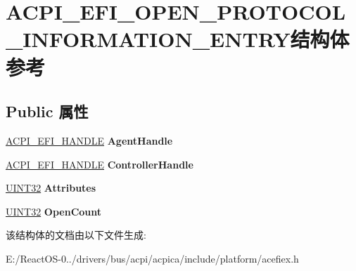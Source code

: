 \hypertarget{struct_a_c_p_i___e_f_i___o_p_e_n___p_r_o_t_o_c_o_l___i_n_f_o_r_m_a_t_i_o_n___e_n_t_r_y}{}\section{A\+C\+P\+I\+\_\+\+E\+F\+I\+\_\+\+O\+P\+E\+N\+\_\+\+P\+R\+O\+T\+O\+C\+O\+L\+\_\+\+I\+N\+F\+O\+R\+M\+A\+T\+I\+O\+N\+\_\+\+E\+N\+T\+R\+Y结构体 参考}
\label{struct_a_c_p_i___e_f_i___o_p_e_n___p_r_o_t_o_c_o_l___i_n_f_o_r_m_a_t_i_o_n___e_n_t_r_y}
\subsection*{Public 属性}
\begin{DoxyCompactItemize}
\item 
\mbox{\label{struct_a_c_p_i___e_f_i___o_p_e_n___p_r_o_t_o_c_o_l___i_n_f_o_r_m_a_t_i_o_n___e_n_t_r_y_af3951330ce0d17396d86d6ebb34a5c09}} 
\hyperlink{interfacevoid}{A\+C\+P\+I\+\_\+\+E\+F\+I\+\_\+\+H\+A\+N\+D\+LE} {\bfseries Agent\+Handle}
\item 
\mbox{\label{struct_a_c_p_i___e_f_i___o_p_e_n___p_r_o_t_o_c_o_l___i_n_f_o_r_m_a_t_i_o_n___e_n_t_r_y_a70c18b28b718de8e9a718a9e3d2883ea}} 
\hyperlink{interfacevoid}{A\+C\+P\+I\+\_\+\+E\+F\+I\+\_\+\+H\+A\+N\+D\+LE} {\bfseries Controller\+Handle}
\item 
\mbox{\label{struct_a_c_p_i___e_f_i___o_p_e_n___p_r_o_t_o_c_o_l___i_n_f_o_r_m_a_t_i_o_n___e_n_t_r_y_a6d752d217aa82331e5958f8b8ecaefd0}} 
\hyperlink{_processor_bind_8h_ae1e6edbbc26d6fbc71a90190d0266018}{U\+I\+N\+T32} {\bfseries Attributes}
\item 
\mbox{\label{struct_a_c_p_i___e_f_i___o_p_e_n___p_r_o_t_o_c_o_l___i_n_f_o_r_m_a_t_i_o_n___e_n_t_r_y_a393f08b66b64aced90958b33d2d34596}} 
\hyperlink{_processor_bind_8h_ae1e6edbbc26d6fbc71a90190d0266018}{U\+I\+N\+T32} {\bfseries Open\+Count}
\end{DoxyCompactItemize}


该结构体的文档由以下文件生成\+:\begin{DoxyCompactItemize}
\item 
E\+:/\+React\+O\+S-\/0../drivers/bus/acpi/acpica/include/platform/acefiex.\+h\end{DoxyCompactItemize}

